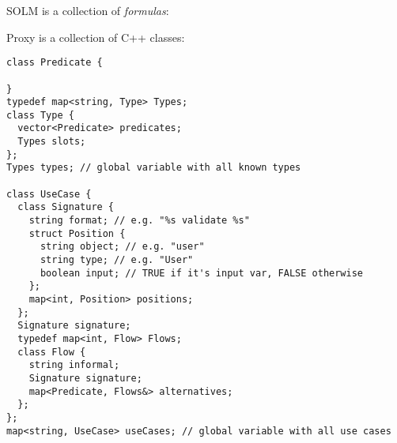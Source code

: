 \documentclass{article}
\begin{document}
    SOLM is a collection of \emph{formulas}:

    
    \clearpage
    Proxy is a collection of C++ classes:
    
    \begin{verbatim}
class Predicate {
  
}
typedef map<string, Type> Types;
class Type {
  vector<Predicate> predicates;
  Types slots;
};
Types types; // global variable with all known types

class UseCase {
  class Signature {
    string format; // e.g. "%s validate %s"
    struct Position {
      string object; // e.g. "user"
      string type; // e.g. "User"
      boolean input; // TRUE if it's input var, FALSE otherwise
    };
    map<int, Position> positions;
  };
  Signature signature;
  typedef map<int, Flow> Flows;
  class Flow {
    string informal;
    Signature signature;
    map<Predicate, Flows&> alternatives;
  };
};
map<string, UseCase> useCases; // global variable with all use cases
\end{verbatim}
\end{document}

